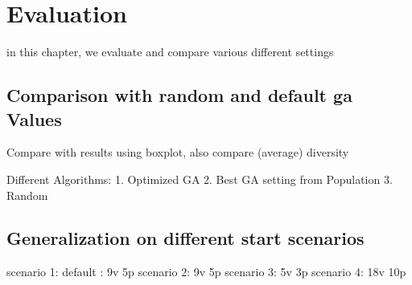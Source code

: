 \chapter{Evaluation}
\label{chap:evaluation}
in this chapter, we evaluate and compare various different settings



\section{Comparison with random and default ga Values}

Compare with results using boxplot, also compare (average) diversity

Different Algorithms:
1. Optimized GA
2. Best GA setting from Population
3. Random





\section{Generalization on different start scenarios}

scenario 1: default : 9v 5p
scenario 2: 9v 5p
scenario 3: 5v 3p
scenario 4: 18v 10p

